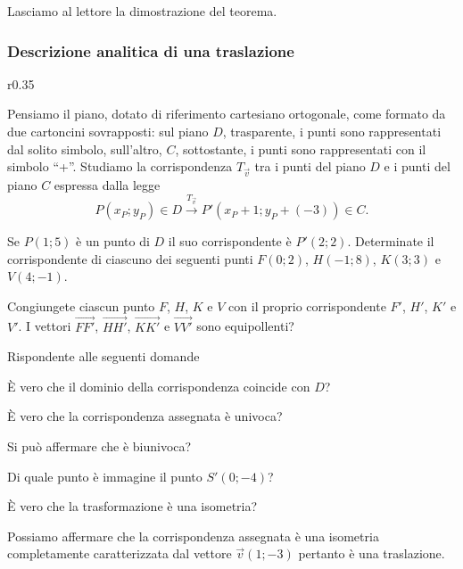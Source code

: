 Lasciamo al lettore la dimostrazione del teorema.
\pagebreak
\subsubsection{Descrizione analitica di una traslazione}

\setlength{\intextsep}{3pt plus 2.0pt minus 2.0pt}
\begin{wrapfigure}{r}{0.35\textwidth}
	
\centering
\end{wrapfigure}
Pensiamo il piano, dotato di riferimento cartesiano ortogonale, come 
formato da due cartoncini sovrapposti: sul piano $D$, trasparente, i 
punti sono rappresentati dal solito simbolo, sull'altro, $C$, 
sottostante, i punti sono rappresentati con il simbolo ``+''.
Studiamo la corrispondenza $T_{\vec{v}}$ tra i punti del piano $D$ e 
i punti del piano $C$ espressa dalla legge
\[P(x_P;y_P)\in D \overset{T_{\vec{v}}}\rightarrow 
P'(x_P+1;y_P+(-3))\in C.\]

%	
\centering

Se $P(1;5)$ è un punto di $D$ il suo corrispondente è $P'(2;2)$. 
Determinate il corrispondente di ciascuno dei seguenti punti 
$F(0;2)$, $H(-1;8)$, $K(3;3)$ e $V(4;-1)$.

Congiungete ciascun punto $F$, $H$, $K$ e $V$ con il proprio 
corrispondente $F'$, $H'$, $K'$ e $V'$. I vettori 
$\overrightarrow{FF'}$, $\overrightarrow{HH'}$, 
$\overrightarrow{KK'}$ e $\overrightarrow{VV'}$ sono equipollenti?

Rispondente alle seguenti domande
\begin{itemize*}
\item \`E vero che il dominio della corrispondenza coincide con $D$?
\item \`E vero che la corrispondenza assegnata è univoca?
\item Si può affermare che è biunivoca?
\item Di quale punto è immagine il punto $S'(0;-4)$?
\item \`E vero che la trasformazione è una isometria?
\end{itemize*}

Possiamo affermare che la corrispondenza assegnata è una isometria 
completamente caratterizzata dal vettore $\vec{v}(1;-3)$ pertanto è 
una traslazione.

